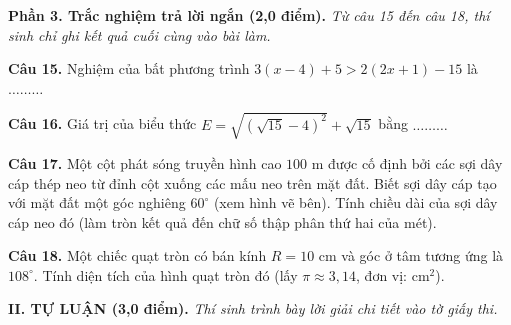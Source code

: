 \documentclass[11pt,a4paper]{article}
\begin{document}
\vspace{3mm}
\noindent
\textbf{Phần 3. Trắc nghiệm trả lời ngắn (2,0 điểm).} \textit{Từ câu 15 đến câu 18, thí sinh chỉ ghi kết quả cuối cùng vào bài làm.}

\vspace{1.5mm}
\textbf{Câu 15.} Nghiệm của bất phương trình $3(x - 4) + 5 > 2(2x + 1) - 15$ là $\dots\dots\dots$

\vspace{1.5mm}
\textbf{Câu 16.} Giá trị của biểu thức $E = \sqrt{(\sqrt{15} - 4)^2} + \sqrt{15}$ bằng $\dots\dots\dots$

\vspace{1.5mm}
\noindent
\begin{minipage}[c]{0.65\linewidth}
\textbf{Câu 17.} Một cột phát sóng truyền hình cao $100\text{ m}$ được cố định bởi các sợi dây cáp thép neo từ đỉnh cột xuống các mấu neo trên mặt đất. Biết sợi dây cáp tạo với mặt đất một góc nghiêng $60^\circ$ (xem hình vẽ bên). Tính chiều dài của sợi dây cáp neo đó (làm tròn kết quả đến chữ số thập phân thứ hai của mét).
\end{minipage}\hfill
\begin{minipage}[c]{0.32\linewidth}
\centering
{}
\end{minipage}

\vspace{1.5mm}
\textbf{Câu 18.} Một chiếc quạt tròn có bán kính $R = 10\text{ cm}$ và góc ở tâm tương ứng là $108^\circ$. Tính diện tích của hình quạt tròn đó (lấy $\pi \approx 3{,}14$, đơn vị: $\text{cm}^2$).

\vspace{4mm}
\noindent
\textbf{\large II. TỰ LUẬN (3,0 điểm).} \textit{Thí sinh trình bày lời giải chi tiết vào tờ giấy thi.}
\end{document}

